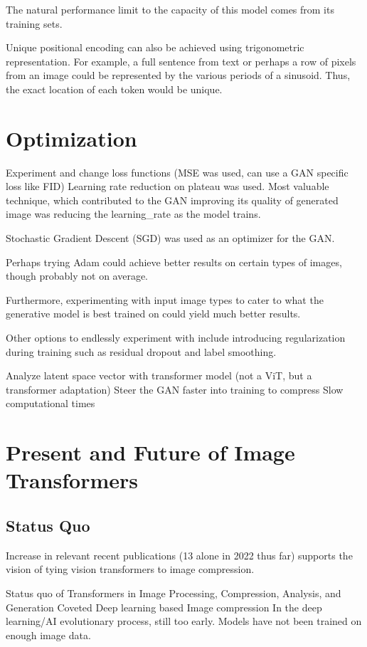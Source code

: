 The natural performance limit to the capacity of this model comes from its training sets.

Unique positional encoding can also be achieved using trigonometric representation.
For example, a full sentence from text or perhaps a row of pixels from an image could be represented by the various
periods of a sinusoid. Thus, the exact location of each token would be unique.

\section{Optimization} 

Experiment and change loss functions (MSE was used, can use a GAN specific loss like FID)
Learning rate reduction on plateau was used.
Most valuable technique, which contributed to the GAN improving its quality of generated image was
reducing the learning\_rate as the model trains.

Stochastic Gradient Descent (SGD) was used as an optimizer for the GAN.

Perhaps trying Adam could achieve better results on certain types of images, though probably
not on average.

Furthermore, experimenting with input image types to cater to what the generative model is best trained on
could yield much better results.

Other options to endlessly experiment with include introducing regularization during training such as residual dropout and label smoothing.

Analyze latent space vector with transformer model (not a ViT, but a transformer adaptation)
Steer the GAN faster into training to compress
Slow computational times



\section{Present and Future of Image Transformers}

\subsection{Status Quo}
Increase in relevant recent publications (13 alone in 2022 thus far) supports the vision of tying 
vision transformers to image compression.

Status quo of Transformers in Image Processing, Compression, Analysis, and Generation
Coveted Deep learning based Image compression 
In the deep learning/AI evolutionary process, still too early. Models have not been trained on enough image data.

